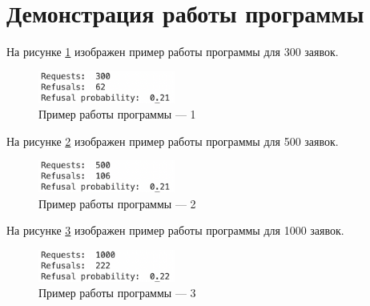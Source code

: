 \documentclass[12pt]{report}
\begin{document}
\section*{Демонстрация работы программы}
На рисунке \ref{fig:pic1} изображен пример работы программы для 300 заявок.

\begin{figure}[h!btp]
	\centering
	\includegraphics[width=0.4\textwidth]{inc/pic1.png}
	\caption{Пример работы программы --- 1}
	\label{fig:pic1}	
\end{figure}

На рисунке \ref{fig:pic2} изображен пример работы программы для 500 заявок.

\begin{figure}[h!btp]
	\centering
	\includegraphics[width=0.4\textwidth]{inc/pic2.png}
	\caption{Пример работы программы --- 2}
	\label{fig:pic2}	
\end{figure}

На рисунке \ref{fig:pic3} изображен пример работы программы для 1000 заявок.

\begin{figure}[h!btp]
	\centering
	\includegraphics[width=0.4\textwidth]{inc/pic3.png}
	\caption{Пример работы программы --- 3}
	\label{fig:pic3}	
\end{figure}

	
\end{document}
